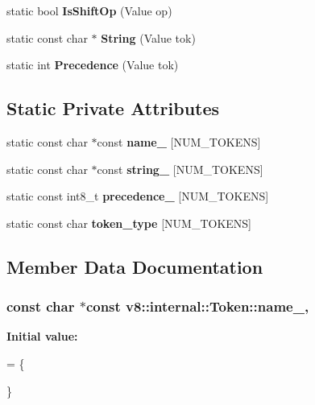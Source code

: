 \begin{DoxyCompactItemize}
\item 
static bool {\bfseries Is\+Shift\+Op} (Value op)\hypertarget{classv8_1_1internal_1_1_token_acecd1f2d38c6527d2a69cd000130c84c}{}\label{classv8_1_1internal_1_1_token_acecd1f2d38c6527d2a69cd000130c84c}

\item 
static const char $\ast$ {\bfseries String} (Value tok)\hypertarget{classv8_1_1internal_1_1_token_a717701258769abde5d426045e1522ed7}{}\label{classv8_1_1internal_1_1_token_a717701258769abde5d426045e1522ed7}

\item 
static int {\bfseries Precedence} (Value tok)\hypertarget{classv8_1_1internal_1_1_token_a751b0771006175b14e3cb4ae0e74e27e}{}\label{classv8_1_1internal_1_1_token_a751b0771006175b14e3cb4ae0e74e27e}

\end{DoxyCompactItemize}
\subsection*{Static Private Attributes}
\begin{DoxyCompactItemize}
\item 
static const char $\ast$const {\bfseries name\+\_\+} \mbox{[}N\+U\+M\+\_\+\+T\+O\+K\+E\+NS\mbox{]}
\item 
static const char $\ast$const {\bfseries string\+\_\+} \mbox{[}N\+U\+M\+\_\+\+T\+O\+K\+E\+NS\mbox{]}
\item 
static const int8\+\_\+t {\bfseries precedence\+\_\+} \mbox{[}N\+U\+M\+\_\+\+T\+O\+K\+E\+NS\mbox{]}
\item 
static const char {\bfseries token\+\_\+type} \mbox{[}N\+U\+M\+\_\+\+T\+O\+K\+E\+NS\mbox{]}
\end{DoxyCompactItemize}


\subsection{Member Data Documentation}
\subsubsection[{\texorpdfstring{name\+\_\+}{name_}}]{\setlength{\rightskip}{0pt plus 5cm}const char $\ast$const v8\+::internal\+::\+Token\+::name\+\_\+\hspace{0.3cm}{\ttfamily [static]}, {\ttfamily [private]}}\hypertarget{classv8_1_1internal_1_1_token_af3077dd5d8601888b3db77e342874b38}{}\label{classv8_1_1internal_1_1_token_af3077dd5d8601888b3db77e342874b38}
{\bfseries Initial value\+:}
\begin{DoxyCode}
= \{

\}
\end{DoxyCode}

